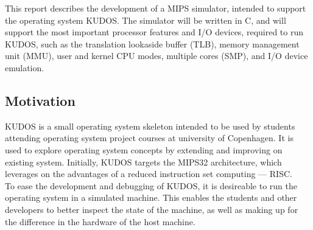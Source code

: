 This report describes the development of a MIPS simulator, intended to support
the operating system KUDOS. The simulator will be written in C, and will
support the most important processor features and I/O devices, required to run
KUDOS, such as the translation lookaside
buffer (TLB), memory management unit (MMU), user and kernel CPU modes,
multiple cores (SMP), and I/O device emulation. \\


\subsection{Motivation}
KUDOS is a small operating system skeleton intended to be used by students
attending operating system project courses at university of Copenhagen.
It is used to explore operating system concepts by extending and improving on
existing system.
Initially, KUDOS targets the MIPS32 architecture, which leverages on the
advantages of a
reduced instruction set computing --- RISC.\\
To ease the development and debugging of KUDOS, it is desireable to run the
operating system
in a simulated machine. This enables the students and other developers to
better inspect the state of the machine, as well as making up
for the difference in the hardware of the host machine.

